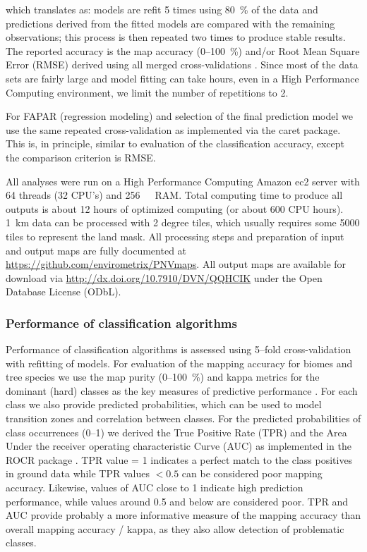 \documentclass[fleqn,10pt,lineno]{wlpeerj} %
\begin{document}
\noindent which translates as: models are refit 5 times using \SI{80}{\percent} of the data and predictions derived from the fitted models are compared with the remaining observations; this process is then repeated two times to produce stable results. The reported accuracy is the map accuracy (0--\SI{100}{\percent}) and/or Root Mean Square Error (RMSE) derived using all merged cross-validations \citep{JSSv028i05,kuhn2013applied}. Since most of the data sets are fairly large and model fitting can take hours, even in a High Performance Computing environment, we limit the number of repetitions to 2.\par

For FAPAR (regression modeling) and selection of the final prediction model we use the same repeated cross-validation as implemented via the \textsf{caret} package. This is, in principle, similar to evaluation of the classification accuracy, except the comparison criterion is RMSE.\par

All analyses were run on a High Performance Computing Amazon ec2 server with 64 threads (32 CPU's) and \SI{256}{\gibi\byte}~RAM. Total computing time to produce all outputs is about 12 hours of optimized computing (or about 600 CPU hours). \SI{1}{\kilo\metre} data can be processed with 2 degree tiles, which usually requires some 5000 tiles to represent the land mask. All processing steps and preparation of input and output maps are fully documented at \url{https://github.com/envirometrix/PNVmaps}. All output maps are available for download via \url{http://dx.doi.org/10.7910/DVN/QQHCIK} under the Open Database License (ODbL). \par

\subsubsection*{Performance of classification algorithms}

Performance of classification algorithms is assessed using 5--fold cross-validation with refitting of models. For evaluation of the mapping accuracy for biomes and tree species we use the map purity (0--\SI{100}{\percent}) and kappa metrics for the dominant (hard) classes as the key measures of predictive performance \citep{kuhn2013applied}. For each class we also provide predicted probabilities, which can be used to model transition zones and correlation between classes. For the predicted probabilities of class occurrences (0--1) we derived the True Positive Rate (TPR) and the Area Under the receiver operating characteristic Curve (AUC) as implemented in the \textsf{ROCR} package \citep{sing2005rocr,ROCR}. TPR value = 1 indicates a perfect match to the class positives in ground data while TPR values $<0.5$ can be considered poor mapping accuracy. Likewise, values of AUC close to 1 indicate high prediction performance, while values around 0.5 and below are considered poor. TPR and AUC provide probably a more informative measure of the mapping accuracy than overall mapping accuracy / kappa, as they also allow detection of problematic classes. \par
\end{document}
